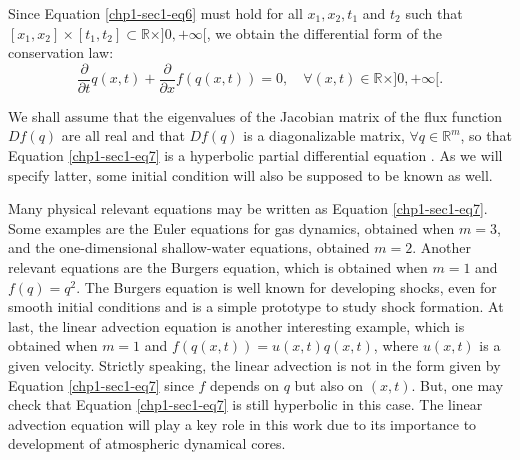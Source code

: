 Since Equation \eqref{chp1-sec1-eq6} must hold for all $x_1, x_2, t_1$ and $t_2$ such that
$[x_1, x_2] \times [t_1, t_2] \subset \mathbb{R}\times ]0, +\infty[$, we obtain the differential form of the conservation law:
\begin{equation}
	\label{chp1-sec1-eq7}
	\frac{\partial}{\partial t}{q}(x, t) +
	\frac{\partial}{\partial x} {f}({q}(x, t))
	= 0, \quad \forall (x,t) \in \mathbb{R}\times ]0, +\infty[. 
\end{equation}

We shall assume that the eigenvalues of the Jacobian matrix of the flux function
$D{f}(q)$ are all real and that $D{f}(q)$ is a diagonalizable matrix,
$\forall q \in \mathbb{R}^m$, so that Equation \eqref{chp1-sec1-eq7}
is a hyperbolic partial differential equation \citep{leveque:1990}. As we will 
specify latter, some initial condition will also be supposed to be known as well.

Many physical relevant equations may be written as Equation \eqref{chp1-sec1-eq7}.
Some examples are the Euler equations for gas dynamics, obtained when $m = 3$,
and the one-dimensional shallow-water equations, obtained $m = 2$.
Another relevant equations are the Burgers equation, which is obtained when
$m = 1$ and $f(q) = q^2$. The Burgers equation is well known for developing shocks,
even for smooth initial conditions and is a simple prototype to study shock formation.
At last, the linear advection equation is another interesting example, which is obtained
when $m = 1$ and $f(q(x,t)) = u(x,t)q(x,t)$, where $u(x,t)$ is a given velocity.
Strictly speaking, the linear advection is not in the form given by Equation
\eqref{chp1-sec1-eq7} since $f$ depends on $q$ but also on $(x,t)$.
But, one may check that Equation \eqref{chp1-sec1-eq7} is still hyperbolic
in this case. The linear advection equation will play a key role in this work due to its importance
to development of atmospheric dynamical cores.


